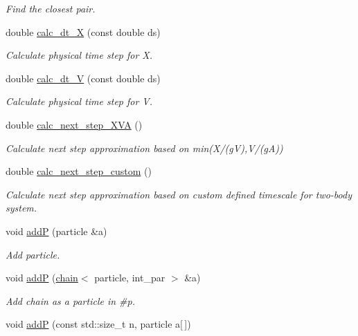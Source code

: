 \begin{DoxyCompactItemize}
\begin{DoxyCompactList}\small\item\em Find the closest pair. \end{DoxyCompactList}\item 
double \hyperlink{classARC_1_1chain_a146941e5213125cc4a1c30622eed4568}{calc\+\_\+dt\+\_\+X} (const double ds)
\begin{DoxyCompactList}\small\item\em Calculate physical time step for X. \end{DoxyCompactList}\item 
double \hyperlink{classARC_1_1chain_a1453e04d5f3e15c51cca5de13832732d}{calc\+\_\+dt\+\_\+V} (const double ds)
\begin{DoxyCompactList}\small\item\em Calculate physical time step for V. \end{DoxyCompactList}\item 
double \hyperlink{classARC_1_1chain_a282545e539f7402b1d44bf285730490a}{calc\+\_\+next\+\_\+step\+\_\+\+X\+VA} ()
\begin{DoxyCompactList}\small\item\em Calculate next step approximation based on min(X/(gV),V/(gA)) \end{DoxyCompactList}\item 
double \hyperlink{classARC_1_1chain_ab3984977684a6ca9bf2214cd957f56a0}{calc\+\_\+next\+\_\+step\+\_\+custom} ()
\begin{DoxyCompactList}\small\item\em Calculate next step approximation based on custom defined timescale for two-\/body system. \end{DoxyCompactList}\item 
void \hyperlink{classARC_1_1chain_a6af4a9c65329265a45f0210c104fa96a}{addP} (particle \&a)
\begin{DoxyCompactList}\small\item\em Add particle. \end{DoxyCompactList}\item 
void \hyperlink{classARC_1_1chain_abf446295cee9e550c32d64e575f68d04}{addP} (\hyperlink{classARC_1_1chain}{chain}$<$ particle, int\+\_\+par $>$ \&a)
\begin{DoxyCompactList}\small\item\em Add chain as a particle in \#p. \end{DoxyCompactList}\item 
void \hyperlink{classARC_1_1chain_a2cd246cb307b8f04766c625de851ff52}{addP} (const std\+::size\+\_\+t n, particle a\mbox{[}$\,$\mbox{]})

\end{DoxyCompactItemize}
